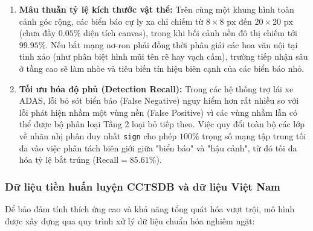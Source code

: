 \documentclass[a4paper, 11pt]{article}
\begin{document}
\begin{enumerate}
    \item \textbf{Mâu thuẫn tỷ lệ kích thước vật thể:} Trên cùng một khung hình toàn cảnh góc rộng, các biển báo cự ly xa chỉ chiếm từ $8 \times 8\text{ px}$ đến $20 \times 20\text{ px}$ (chưa đầy $0.05\%$ diện tích canvas), trong khi bối cảnh nền đô thị chiếm tới $99.95\%$. Nếu bắt mạng nơ-ron phải đồng thời phân giải các hoa văn nội tại tinh xảo (như phân biệt hình mũi tên rẽ hay vạch cấm), trường tiếp nhận sâu ở tầng cao sẽ làm nhòe và tiêu biến tín hiệu biên cạnh của các biển báo nhỏ.
    \item \textbf{Tối ưu hóa độ phủ (Detection Recall):} Trong các hệ thống trợ lái xe ADAS, lỗi bỏ sót biển báo (False Negative) nguy hiểm hơn rất nhiều so với lỗi phát hiện nhầm một vùng nền (False Positive) vì các vùng nhầm lẫn có thể được bộ phân loại Tầng 2 loại bỏ tiếp theo. Việc quy đổi toàn bộ các lớp về nhãn nhị phân duy nhất \texttt{sign} cho phép $100\%$ trọng số mạng tập trung tối đa vào việc phân tách biên giới giữa "biển báo" và "hậu cảnh", từ đó tối đa hóa tỷ lệ bắt trúng ($\text{Recall} = 85.61\%$).
\end{enumerate}

\subsubsection{Dữ liệu tiền huấn luyện CCTSDB và dữ liệu Việt Nam}
\label{subsubsec:pretrain_cctsdb_vn}

Để bảo đảm tính thích ứng cao và khả năng tổng quát hóa vượt trội, mô hình được xây dựng qua quy trình xử lý dữ liệu chuẩn hóa nghiêm ngặt:
\end{document}
